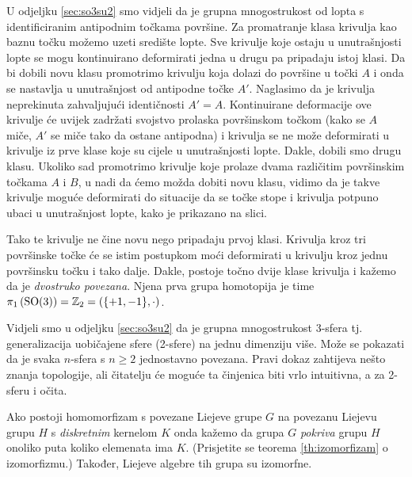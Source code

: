 \begin{primjer}[\SO{3}]

U odjeljku \ref{sec:so3su2} smo vidjeli da je grupna mnogostrukost od 
lopta s identificiranim antipodnim točkama površine.
Za promatranje
klasa krivulja kao baznu točku možemo uzeti središte lopte. Sve krivulje
koje ostaju u unutrašnjosti lopte se mogu kontinuirano deformirati jedna
u drugu pa pripadaju istoj klasi. Da bi dobili novu klasu promotrimo
krivulju koja dolazi do površine u točki $A$ i onda se nastavlja u unutrašnjost
od antipodne točke $A'$. Naglasimo da je krivulja neprekinuta zahvaljujući
identičnosti $A'=A$.
Kontinuirane deformacije ove krivulje će uvijek
zadržati svojstvo prolaska površinskom točkom (kako se $A$ miče, $A'$ se
miče tako da ostane antipodna) i krivulja se ne može deformirati u krivulje
iz prve klase koje su cijele u unutrašnjosti lopte. Dakle, dobili smo
drugu klasu. Ukoliko sad promotrimo krivulje koje prolaze dvama različitim površinskim
točkama $A$ i $B$, u nadi da ćemo možda dobiti novu klasu, vidimo da je takve
krivulje moguće deformirati do situacije da se točke stope i krivulja potpuno
ubaci u unutrašnjost lopte, kako je prikazano na slici.

\centerline{}

Tako te krivulje ne čine novu nego pripadaju prvoj klasi.
Krivulja kroz tri površinske točke će se istim postupkom moći deformirati u 
krivulju kroz jednu površinsku točku i tako dalje. Dakle, postoje točno dvije klase
krivulja i kažemo da je   \emph{dvostruko povezana}.
Njena prva grupa homotopija je time
    $\pi_1\left(\mathrm{SO}(3) \right) = \mathbb{Z}_{2} = (\{+1, -1\}, \cdot)$.
\end{primjer}

\begin{primjer}[\SU{2}] 
Vidjeli smo u odjeljku \ref{sec:so3su2} da je
grupna mnogostrukost  3-sfera tj. generalizacija uobičajene
sfere (2-sfere) na jednu dimenziju više. 
Može se pokazati da je svaka $n$-sfera s $n\ge 2$ jednostavno povezana.
Pravi dokaz zahtijeva nešto znanja topologije, ali čitatelju će
moguće ta činjenica biti vrlo intuitivna, a za 2-sferu i očita.
\end{primjer}

Ako postoji homomorfizam s povezane Liejeve grupe $G$ na povezanu Liejevu
grupu $H$ s \emph{diskretnim} kernelom $K$ onda kažemo da grupa $G$ 
\emph{pokriva} grupu $H$ onoliko puta koliko elemenata ima $K$.
  
(Prisjetite se teorema \ref{th:izomorfizam} o izomorfizmu.)
Također, Liejeve algebre tih grupa su izomorfne.

